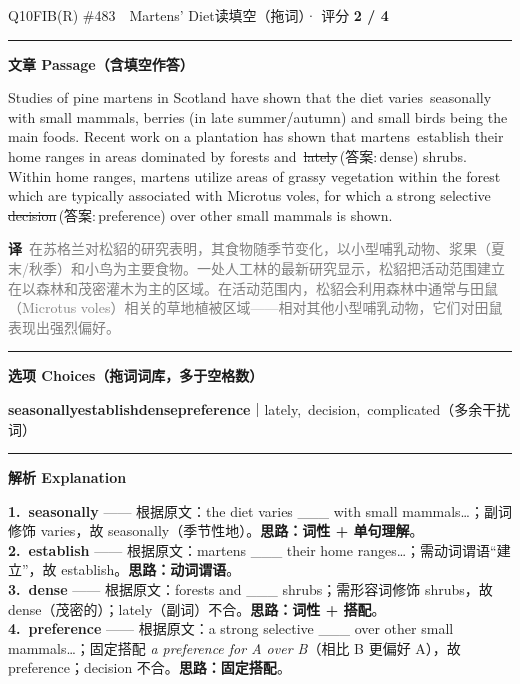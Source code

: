 \documentclass[11pt]{article}
\newcommand{\ptesub}[1]{%
  \par\needspace{2\baselineskip}\smallskip
  {\color{cAccent}\rule[-0.2ex]{3pt}{1.05em}}\hspace{6pt}%
  {\bfseries\color{cHead}#1}\par\nopagebreak\smallskip}
\newcommand{\zh}[1]{{\footnotesize\textcolor{cNote}{\textbf{译}}\ \textcolor{gray}{#1}}}
\newcommand{\rok}[1]{{\color{cFix}\ding{51}\,#1}}                 %
\newcommand{\rno}[2]{{\color{cWrong}\ding{55}\,\sout{#1}}\,{\footnotesize\color{cFix}(答案:\,#2)}}  %
\begin{document}
\begin{qblock}{Q10\quad FIB(R) \#483\ \ Martens' Diet}{读填空（拖词）· 评分 \textcolor{cAccent}{\bfseries 2 / 4}}
\ptesub{文章 Passage（含填空作答）}
\begin{promptbox}
Studies of pine martens in Scotland have shown that the diet varies \rok{seasonally} with small mammals, berries (in late summer/autumn) and small birds being the main foods. Recent work on a plantation has shown that martens \rok{establish} their home ranges in areas dominated by forests and \rno{lately}{dense} shrubs. Within home ranges, martens utilize areas of grassy vegetation within the forest which are typically associated with Microtus voles, for which a strong selective \rno{decision}{preference} over other small mammals is shown.
\end{promptbox}
\zh{在苏格兰对松貂的研究表明，其食物随季节变化，以小型哺乳动物、浆果（夏末/秋季）和小鸟为主要食物。一处人工林的最新研究显示，松貂把活动范围建立在以森林和茂密灌木为主的区域。在活动范围内，松貂会利用森林中通常与田鼠（Microtus voles）相关的草地植被区域——相对其他小型哺乳动物，它们对田鼠表现出强烈偏好。}
\ptesub{选项 Choices（拖词词库，多于空格数）}
{\small \textbf{seasonally}\quad \textbf{establish}\quad \textbf{dense}\quad \textbf{preference}\quad ｜\quad lately,\ decision,\ complicated（多余干扰词）}
\ptesub{解析 Explanation}
\begin{notebox}\footnotesize
\textbf{1.\ seasonally} —— 根据原文：the diet varies \_\_\_ with small mammals…；副词修饰 varies，故 seasonally（季节性地）。\textbf{思路：词性 + 单句理解}。\\[2pt]
\textbf{2.\ establish} —— 根据原文：martens \_\_\_ their home ranges…；需动词谓语“建立”，故 establish。\textbf{思路：动词谓语}。\\[2pt]
\textbf{3.\ dense} —— 根据原文：forests and \_\_\_ shrubs；需形容词修饰 shrubs，故 dense（茂密的）；lately（副词）不合。\textbf{思路：词性 + 搭配}。\\[2pt]
\textbf{4.\ preference} —— 根据原文：a strong selective \_\_\_ over other small mammals…；固定搭配 \emph{a preference for A over B}（相比 B 更偏好 A），故 preference；decision 不合。\textbf{思路：固定搭配}。
\end{notebox}
\end{qblock}
\end{document}
